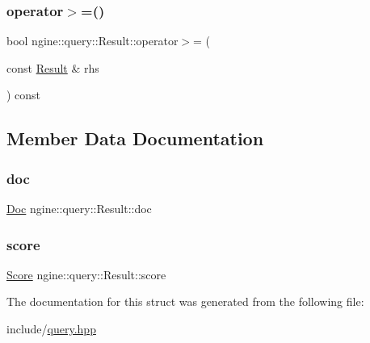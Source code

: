 \mbox{\label{structngine_1_1query_1_1Result_ae563d95194ce9ff905a8f4cede93c812}} 
\subsubsection{\texorpdfstring{operator$>$=()}{operator>=()}}
{\footnotesize\ttfamily bool ngine\+::query\+::\+Result\+::operator$>$= (\begin{DoxyParamCaption}\item[{const \hyperlink{structngine_1_1query_1_1Result}{Result} \&}]{rhs }\end{DoxyParamCaption}) const\hspace{0.3cm}{\ttfamily [inline]}}



\subsection{Member Data Documentation}
\mbox{\label{structngine_1_1query_1_1Result_a5e60300ed3018f83db817b5f8c5c014c}} 
\subsubsection{\texorpdfstring{doc}{doc}}
{\footnotesize\ttfamily \hyperlink{structngine_1_1Doc}{Doc} ngine\+::query\+::\+Result\+::doc}

\mbox{\label{structngine_1_1query_1_1Result_acc2d6248efc5b0b80104b61cbeb9ca7a}} 
\subsubsection{\texorpdfstring{score}{score}}
{\footnotesize\ttfamily \hyperlink{structngine_1_1Score}{Score} ngine\+::query\+::\+Result\+::score}



The documentation for this struct was generated from the following file\+:\begin{DoxyCompactItemize}
\item 
include/\hyperlink{query_8hpp}{query.\+hpp}\end{DoxyCompactItemize}
